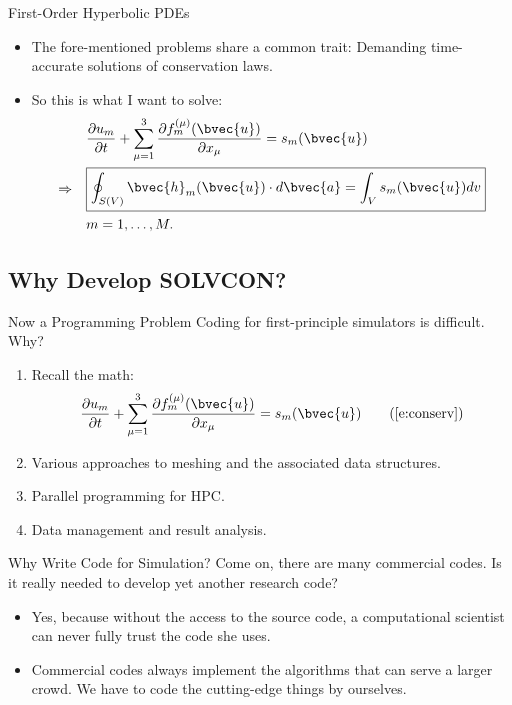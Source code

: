 \documentclass[dvips,xcolor=pst,14pt]{beamer}
\begin{document}
\begin{frame}{
%
First-Order Hyperbolic PDEs
%
}
\begin{itemize}
  \item The fore-mentioned problems share a common trait: Demanding
  time-accurate solutions of conservation laws.
  \item So this is what I want to solve:
  {\footnotesize \begin{align}
   &\frac{\partial u_m}{\partial t}
      + \sum_{\mu=1}^3\frac{\partial f^{(\mu)}_m(\bvec{u})}{\partial x_{\mu}}
      = s_m(\bvec{u}) \notag \\
    \Rightarrow \quad &\boxed{\begin{gathered}
      \oint_{S(V)}\bvec{h}_m(\bvec{u})\cdot d\bvec{a}
      = \int_{V}s_m(\bvec{u})dv
    \end{gathered}} \label{e:conserv} \\
   &m = 1, \ldots, M. \notag
  \end{align}}
\end{itemize}
\end{frame}

\subsection{
Why Develop SOLVCON?
}

\begin{frame}{
%
Now a Programming Problem
%
}
Coding for first-principle simulators is difficult.  Why?
\begin{enumerate}
  \item Recall the math:
  {\footnotesize \begin{align}
   \frac{\partial u_m}{\partial t}
      + \sum_{\mu=1}^3\frac{\partial f^{(\mu)}_m(\bvec{u})}{\partial x_{\mu}}
      = s_m(\bvec{u}) \tag{\ref{e:conserv}}
  \end{align}}
  \item Various approaches to meshing and the associated data structures.
  \item Parallel programming for HPC.
  \item Data management and result analysis.
\end{enumerate}
\end{frame}

\begin{frame}{
%
Why Write Code for Simulation?
%
}
Come on, there are many commercial codes.  Is it really needed to develop yet
another research code?
\begin{itemize}
  \item Yes, because without the access to the source code, a computational
  scientist can never fully trust the code she uses.
  \item Commercial codes always implement the algorithms that can serve a
  larger crowd.  We have to code the cutting-edge things by ourselves.
\end{itemize}
\end{frame}
\end{document}

